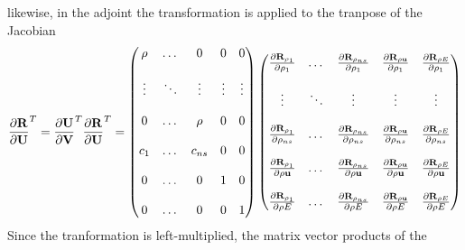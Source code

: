 likewise, in the adjoint the transformation is applied to the tranpose of the 
Jacobian
\begin{equation}
  \begin{aligned}
    \frac{\partial \mathbf R}{\partial \mathbf U}^{T} = \frac{\partial \mathbf U}{\partial \mathbf V}^{T} \frac{\partial \mathbf R}{\partial \mathbf U}^{T} =
    \begin{pmatrix}
      \rho   & \dots  & 0      &  0      & 0      \\ \\
      \vdots & \ddots & \vdots &  \vdots & \vdots \\ \\
      0      & \dots  &\rho    &  0      & 0      \\ \\
      c_1    & \dots  & c_{ns} &  0      & 0      \\ \\
      0      & \dots  & 0      &  1      & 0      \\ \\
      0      & \dots  & 0      &  0      & 1
    \end{pmatrix}
    \begin{pmatrix}
      \frac{\partial \mathbf R_{\rho_1}}{\partial \rho_1}    & \dots  & \frac{\partial \mathbf R_{\rho_{ns}}}{\partial \rho_1}    & \frac{\partial \mathbf R_{\rho \mathbf u}}{\partial \rho_1}    & \frac{\partial \mathbf R_{\rho E}}{\partial \rho_1} \\ \\
      \vdots                    & \ddots & \vdots                       & \vdots                      & \vdots                   \\ \\
      \frac{\partial \mathbf R_{\rho_1}}{\partial \rho_{ns}} & \dots  & \frac{\partial \mathbf R_{\rho_{ns}}}{\partial \rho_{ns}} & \frac{\partial \mathbf R_{\rho \mathbf u}}{\partial \rho_{ns}} & \frac{\partial \mathbf R_{\rho E}}{\partial \rho_{ns}} \\ \\
      \frac{\partial \mathbf R_{\rho_1}}{\partial \rho \mathbf u}  & \dots  & \frac{\partial \mathbf R_{\rho_{ns}}}{\partial \rho \mathbf u}  & \frac{\partial \mathbf R_{\rho \mathbf u}}{\partial \rho \mathbf u}  & \frac{\partial \mathbf R_{\rho E}}{\partial \rho \mathbf u} \\ \\
      \frac{\partial \mathbf R_{\rho_1}}{\partial \rho E}    & \dots  & \frac{\partial \mathbf R_{\rho_{ns}}}{\partial \rho E}    & \frac{\partial \mathbf R_{\rho \mathbf u}}{\partial \rho E}    & \frac{\partial \mathbf R_{\rho E}}{\partial \rho E}
    \end{pmatrix}
  \end{aligned}
  \label{drdu-to-drdv-t}
\end{equation}
Since the tranformation is left-multiplied, the matrix vector products of the 
